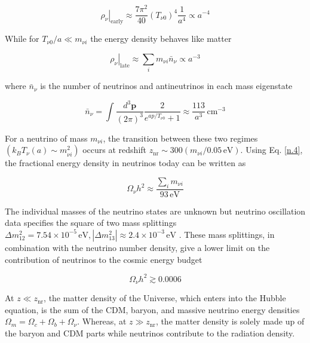 \begin{equation}
    \left.\rho_{\nu}\right|_{\text{early}} \approx \frac{7 \pi^{2}}{40} \left(T_{\nu 0}\right)^{4} \frac{1}{a^{4}} \propto a^{-4}
    \label{n.3}
\end{equation}

While for $T_{\nu 0} / a \ll m_{\nu i}$ the energy density behaves like matter

\begin{equation}
    \left.\rho_{\nu}\right|_{\text{late}} \approx \sum_{i} m_{\nu i} \bar{n}_{\nu} \propto a^{-3}
    \label{n.4}
\end{equation}

where $\bar{n}_{\nu}$ is the number of neutrinos and antineutrinos in each mass eigenstate

\begin{equation}
    \bar{n}_{\nu} = \int \frac{d^{3} \mathbf{p}}{(2 \pi)^{3}} \frac{2}{e^{a p / T_{\nu 0}} + 1} \approx \frac{113}{a^{3}} \, \mathrm{cm}^{-3}
    \label{n.5}
\end{equation}

For a neutrino of mass $m_{\nu i}$, the transition between these two regimes $\left(k_{B} T_{\nu}(a) \sim m_{\nu i}^{2}\right)$ occurs at redshift $z_{\mathrm{nr}} \sim 300\left(m_{\nu i} / 0.05 \, \mathrm{eV}\right)$. Using Eq. \ref{n.4}, the fractional energy density in neutrinos today can be written as

\begin{equation}
    \Omega_{\nu} h^{2} \approx \frac{\sum_{i} m_{\nu i}}{93 \, \mathrm{eV}}
    \label{n.6}
\end{equation}

The individual masses of the neutrino states are unknown but neutrino oscillation data specifies the square of two mass splittings $\Delta m_{12}^{2} = 7.54 \times 10^{-5} \, \mathrm{eV}, \left|\Delta m_{13}^{2}\right| \approx 2.4 \times 10^{-3} \, \mathrm{eV}$ \cite{ParticleDataGroup:2014cgo}. These mass splittings, in combination with the neutrino number density, give a lower limit on the contribution of neutrinos to the cosmic energy budget \cite{abazajian2016cmbs4sciencebookedition}

\begin{equation}
    \Omega_{\nu} h^{2} \gtrsim 0.0006
    \label{n.7}
\end{equation}

At $z \ll z_{\mathrm{nr}}$, the matter density of the Universe, which enters into the Hubble equation, is the sum of the CDM, baryon, and massive neutrino energy densities $\Omega_{m} = \Omega_{c} + \Omega_{b} + \Omega_{\nu}$. Whereas, at $z \gg z_{\mathrm{nr}}$, the matter density is solely made up of the baryon and CDM parts while neutrinos contribute to the radiation density.

